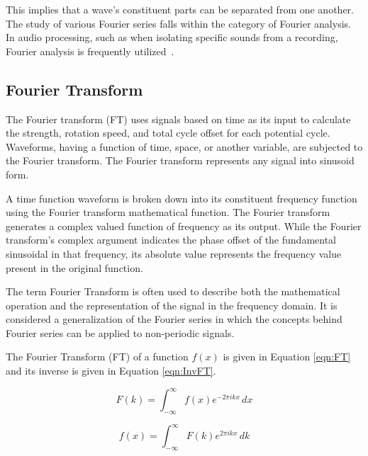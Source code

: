 \documentclass[a4paper, 12pt]{scrartcl}
\begin{document}
This implies that a wave's constituent parts can be separated from one another.
The study of various Fourier series falls within the category of Fourier analysis.
In audio processing, such as when isolating specific sounds from a recording, Fourier analysis is frequently utilized~\cite{tolstov1976fourier}.

\subsection{Fourier Transform}
The Fourier transform (FT) uses signals based on time as its input to calculate the strength, rotation speed, and total cycle offset for each potential cycle.
Waveforms, having a function of time, space, or another variable, are subjected to the Fourier transform.
The Fourier transform represents any signal into sinusoid form.

A time function waveform is broken down into its constituent frequency function using the Fourier transform mathematical function.
The Fourier transform generates a complex valued function of frequency as its output.
While the Fourier transform's complex argument indicates the phase offset of the fundamental sinusoidal in that frequency, its absolute value represents the frequency value present in the original function.

The term Fourier Transform is often used to describe both the mathematical operation and the representation of the signal in the frequency domain.
It is considered a generalization of the Fourier series in which the concepts behind Fourier series can be applied to non-periodic signals.

The Fourier Transform (FT) of a function $f(x)$ is given in Equation \ref{eqn:FT} and its inverse is given in Equation \ref{eqn:InvFT}.

\begin{equation}
  \label{eqn:FT}
  F(k) = \int^{\infty}_{-\infty} f(x) e^{-2 \pi i k x} \,dx
\end{equation}

\begin{equation}
  \label{eqn:InvFT}
  f(x) = \int^{\infty}_{-\infty} F(k) e^{2 \pi i k x} \,dk
\end{equation}
\end{document}
